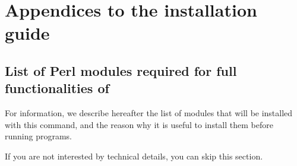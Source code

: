 
\chapter{Appendices to the installation guide}

\section{List of Perl modules required for full functionalities of
  \RSAT}

For information, we describe hereafter the list of modules that will
be installed with this command, and the reason why it is useful to
install them before running \RSAT programs.

If you are not interested by technical details, you can skip this
section.


